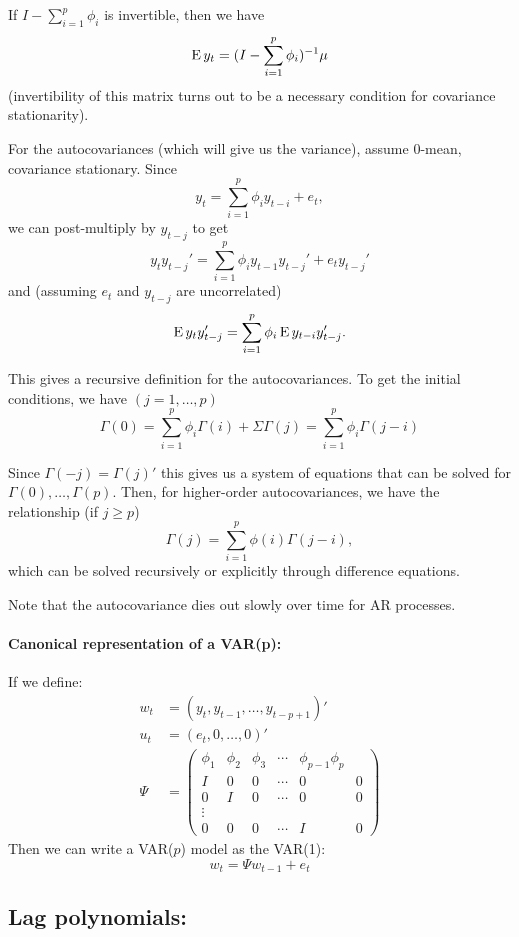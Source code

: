   If $I - \sum_{i=1}^p \phi_i$ is invertible, then we have
  \[\operatorname{E} y_t = (I - \sum_{i=1}^p \phi_i )^{-1} \mu\]
  (invertibility of this matrix turns out to be a necessary condition
  for covariance stationarity).

  For the autocovariances (which will give us the variance), assume
  0-mean, covariance stationary. Since
  \[y_t = \sum_{i=1}^p \phi_i y_{t-i} + e_t,\]
  we can post-multiply by $y_{t-j}$ to get
  \[y_t y_{t-j}' = \sum_{i=1}^p \phi_i y_{t-1} y_{t-j}' + e_t y_{t-j}'\]
  and (assuming $e_t$ and $y_{t-j}$ are uncorrelated)
  \[\operatorname{E} y_t y_{t-j}' = \sum_{i=1}^p \phi_i \operatorname{E} y_{t-i} y_{t-j}'.\]

  This gives a recursive definition for the autocovariances. To get
  the initial conditions, we have $(j = 1,\dots,p)$
  \[\Gamma(0) = \sum_{i=1}^p \phi_i \Gamma(i) + \Sigma \Gamma(j) = \sum_{i=1}^p \phi_i \Gamma(j-i) \]

  Since $\Gamma(-j) = \Gamma(j)'$ this gives us a system of equations that can
  be solved for $\Gamma(0),\dots,\Gamma(p)$. Then, for higher-order autocovariances,
  we have the relationship (if $j \geq p$)
  \[\Gamma(j) = \sum_{i=1}^p \phi(i) \Gamma(j-i),\]
  which can be solved recursively or explicitly through difference
  equations.

  Note that the autocovariance dies out slowly over time for AR
  processes.

\paragraph{Canonical representation of a VAR(p):}
If we define:
\begin{align}
  w_t &= (y_t, y_{t-1}, \dots, y_{t-p+1})' \\
  u_t &= (e_t, 0, \dots, 0)' \\
  \Psi &= \begin{pmatrix}
    \phi_1 & \phi_2 & \phi_3 & \cdots & \phi_{p-1} \phi_p \\
    I & 0 & 0 & \cdots & 0 & 0 \\
    0 & I & 0 & \cdots & 0 & 0 \\
    \vdots \\
    0 & 0 & 0 & \cdots & I & 0
  \end{pmatrix}
\end{align}
Then we can write a VAR($p$) model as the VAR(1):
\[w_t = \Psi w_{t-1} + e_t\]

\subsection{Lag polynomials:}

